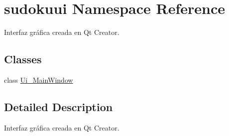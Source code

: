 \hypertarget{namespacesudokuui}{\section{sudokuui Namespace Reference}
\label{namespacesudokuui}
}


Interfaz gráfica creada en Qt Creator.  


\subsection*{Classes}
\begin{DoxyCompactItemize}
\item 
class \hyperlink{classsudokuui_1_1_ui___main_window}{Ui\-\_\-\-Main\-Window}
\end{DoxyCompactItemize}


\subsection{Detailed Description}
Interfaz gráfica creada en Qt Creator. 